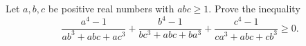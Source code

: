 Let $a,b,c$ be positive real numbers with $abc \geq 1$. Prove the inequality
$$\frac{a^4-1}{ab^3+abc+ac^3} + \frac{b^4-1}{bc^3+abc+ba^3} + \frac{c^4-1}{ca^3+abc+cb^3}\ge 0.$$